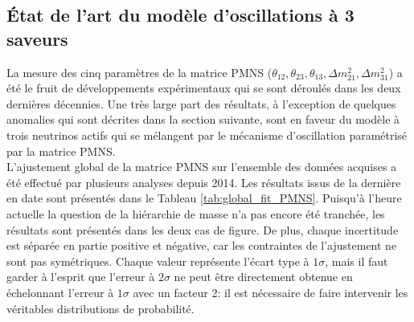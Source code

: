 %

\subsection{État de l'art du modèle d'oscillations à 3 saveurs}

La mesure des cinq paramètres de la matrice PMNS ($\theta_{12}, \theta_{23}, \theta_{13}, \Delta m_{21}^2, \Delta m_{31}^2$) a été le fruit de développements expérimentaux qui se sont déroulés dans les deux dernières décennies. Une très large part des résultats, à l'exception de quelques anomalies qui sont décrites dans la section suivante, sont en faveur du modèle à trois neutrinos actifs qui se mélangent par le mécanisme d'oscillation paramétrisé par la matrice PMNS.\\

L'ajustement global de la matrice PMNS sur l'ensemble des données acquises a été effectué par plusieurs analyses depuis 2014. Les résultats issus de la dernière en date \cite{Esteban2017} sont présentés dans le Tableau \ref{tab:global_fit_PMNS}. Puisqu'à l'heure actuelle la question de la hiérarchie de masse n'a pas encore été tranchée, les résultats sont présentés dans les deux cas de figure. De plus, chaque incertitude est séparée en partie positive et négative, car les contraintes de l'ajustement ne sont pas symétriques. Chaque valeur représente l'écart type à $1\sigma$, mais il faut garder à l'esprit que l'erreur à $2\sigma$ ne peut être directement obtenue en échelonnant l'erreur à $1\sigma$ avec un facteur 2: il est nécessaire de faire intervenir les véritables distributions de probabilité.

